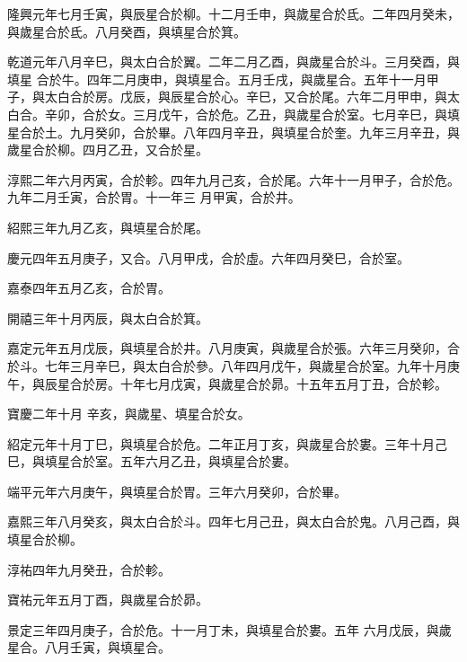 \begin{pinyinscope}
 隆興元年七月壬寅，與辰星合於柳。十二月壬申，與歲星合於氐。二年四月癸未，與歲星合於氐。八月癸酉，與填星合於箕。



 乾道元年八月辛巳，與太白合於翼。二年二月乙酉，與歲星合於斗。三月癸酉，與填星
 合於牛。四年二月庚申，與填星合。五月壬戌，與歲星合。五年十一月甲子，與太白合於房。戊辰，與辰星合於心。辛巳，又合於尾。六年二月甲申，與太白合。辛卯，合於女。三月戊午，合於危。乙丑，與歲星合於室。七月辛巳，與填星合於土。九月癸卯，合於畢。八年四月辛丑，與填星合於奎。九年三月辛丑，與歲星合於柳。四月乙丑，又合於星。



 淳熙二年六月丙寅，合於軫。四年九月己亥，合於尾。六年十一月甲子，合於危。九年二月壬寅，合於胃。十一年三
 月甲寅，合於井。



 紹熙三年九月乙亥，與填星合於尾。



 慶元四年五月庚子，又合。八月甲戌，合於虛。六年四月癸巳，合於室。



 嘉泰四年五月乙亥，合於胃。



 開禧三年十月丙辰，與太白合於箕。



 嘉定元年五月戊辰，與填星合於井。八月庚寅，與歲星合於張。六年三月癸卯，合於斗。七年三月辛巳，與太白合於參。八年四月戊午，與歲星合於室。九年十月庚午，與辰星合於房。十年七月戊寅，與歲星合於昴。十五年五月丁丑，合於軫。



 寶慶二年十月
 辛亥，與歲星、填星合於女。



 紹定元年十月丁巳，與填星合於危。二年正月丁亥，與歲星合於婁。三年十月己巳，與填星合於室。五年六月乙丑，與填星合於婁。



 端平元年六月庚午，與填星合於胃。三年六月癸卯，合於畢。



 嘉熙三年八月癸亥，與太白合於斗。四年七月己丑，與太白合於鬼。八月己酉，與填星合於柳。



 淳祐四年九月癸丑，合於軫。



 寶祐元年五月丁酉，與歲星合於昴。



 景定三年四月庚子，合於危。十一月丁未，與填星合於婁。五年
 六月戊辰，與歲星合。八月壬寅，與填星合。




\end{pinyinscope}
